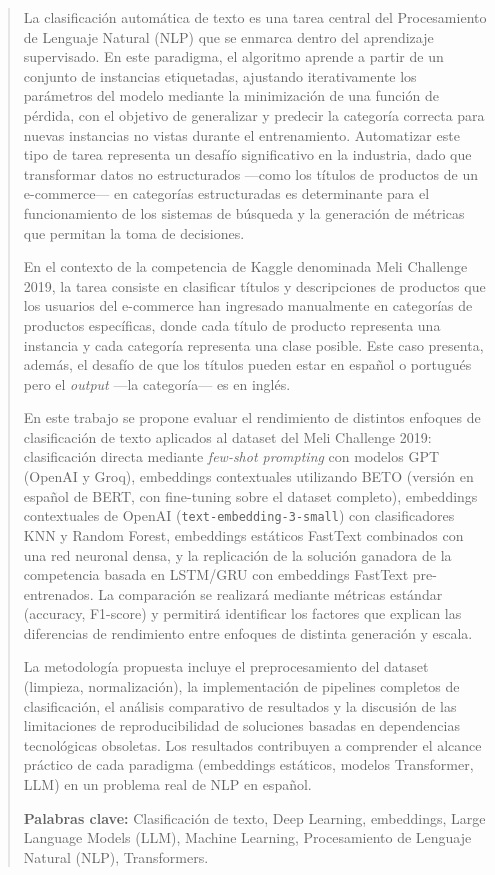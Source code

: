 \documentclass[11pt,a4paper]{article}
\begin{document}
\begin{abstract}
La clasificación automática de texto es una tarea central del Procesamiento de Lenguaje Natural (NLP) que se enmarca dentro del aprendizaje supervisado. En este paradigma, el algoritmo aprende a partir de un conjunto de instancias etiquetadas, ajustando iterativamente los parámetros del modelo mediante la minimización de una función de pérdida, con el objetivo de generalizar y predecir la categoría correcta para nuevas instancias no vistas durante el entrenamiento. Automatizar este tipo de tarea representa un desafío significativo en la industria, dado que transformar datos no estructurados ---como los títulos de productos de un e-commerce--- en categorías estructuradas es determinante para el funcionamiento de los sistemas de búsqueda y la generación de métricas que permitan la toma de decisiones.

En el contexto de la competencia de Kaggle denominada Meli Challenge 2019, la tarea consiste en clasificar títulos y descripciones de productos que los usuarios del e-commerce han ingresado manualmente en categorías de productos específicas, donde cada título de producto representa una instancia y cada categoría representa una clase posible. Este caso presenta, además, el desafío de que los títulos pueden estar en español o portugués pero el \textit{output} ---la categoría--- es en inglés.

En este trabajo se propone evaluar el rendimiento de distintos enfoques de clasificación de texto aplicados al dataset del Meli Challenge 2019: clasificación directa mediante \emph{few-shot prompting} con modelos GPT (OpenAI y Groq), embeddings contextuales utilizando BETO (versión en español de BERT, con fine-tuning sobre el dataset completo), embeddings contextuales de OpenAI (\texttt{text-embedding-3-small}) con clasificadores KNN y Random Forest, embeddings estáticos FastText combinados con una red neuronal densa, y la replicación de la solución ganadora de la competencia basada en LSTM/GRU con embeddings FastText pre-entrenados. La comparación se realizará mediante métricas estándar (accuracy, F1-score) y permitirá identificar los factores que explican las diferencias de rendimiento entre enfoques de distinta generación y escala.

La metodología propuesta incluye el preprocesamiento del dataset (limpieza, normalización), la implementación de pipelines completos de clasificación, el análisis comparativo de resultados y la discusión de las limitaciones de reproducibilidad de soluciones basadas en dependencias tecnológicas obsoletas. Los resultados contribuyen a comprender el alcance práctico de cada paradigma (embeddings estáticos, modelos Transformer, LLM) en un problema real de NLP en español.

\smallskip
\noindent\textbf{Palabras clave:} Clasificación de texto, Deep Learning, embeddings, Large Language Models (LLM), Machine Learning, Procesamiento de Lenguaje Natural (NLP), Transformers.
\end{abstract}
\end{document}
